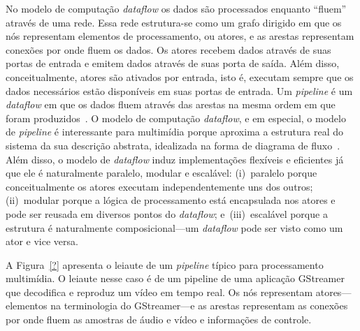 \documentclass{SBCbookchapter}
\def\en#1{\foreignlanguage{english}{\emph{#1}}}
\begin{document}
No modelo de computação \en{dataflow} os dados são processados enquanto
``fluem'' através de uma rede.  Essa rede estrutura-se como um grafo
dirigido em que os nós representam elementos de processamento, ou atores, e
as arestas representam conexões por onde fluem os dados.  Os atores recebem
dados através de suas portas de entrada e emitem dados através de suas porta
de saída.  Além disso, conceitualmente, atores são ativados por entrada,
isto é, executam sempre que os dados necessários estão disponíveis em suas
portas de entrada.  Um \en{pipeline} é um \en{dataflow} em que os dados
fluem através das arestas na mesma ordem em que foram
produzidos~\cite{Kahn-G-1977,Lee-E-A-1995}.  O modelo de computação
\en{dataflow}, e em especial, o modelo de \en{pipeline} é interessante para
multimídia porque aproxima a estrutura real do sistema da sua descrição
abstrata, idealizada na forma de diagrama de fluxo~\cite{Yviquel-H-2014}.
Além disso, o modelo de \en{dataflow} induz implementações flexíveis e
eficientes já que ele é naturalmente paralelo, modular e escalável:
(i)~paralelo porque conceitualmente os atores executam independentemente uns
dos outros; (ii)~modular porque a lógica de processamento está encapsulada
nos atores e pode ser reusada em diversos pontos do \en{dataflow};
e~(iii)~escalável porque a estrutura é naturalmente composicional---um
\en{dataflow} pode ser visto como um ator e vice versa.

A Figura~\ref{?} apresenta o leiaute de um \en{pipeline} típico para
processamento multimídia.  O leiaute nesse caso é de um pipeline de uma
aplicação GStreamer que decodifica e reproduz um vídeo em tempo real.  Os
nós representam atores---elementos na terminologia do GStreamer---e as
arestas representam as conexões por onde fluem as amostras de áudio e vídeo
e informações de controle.
\end{document}
